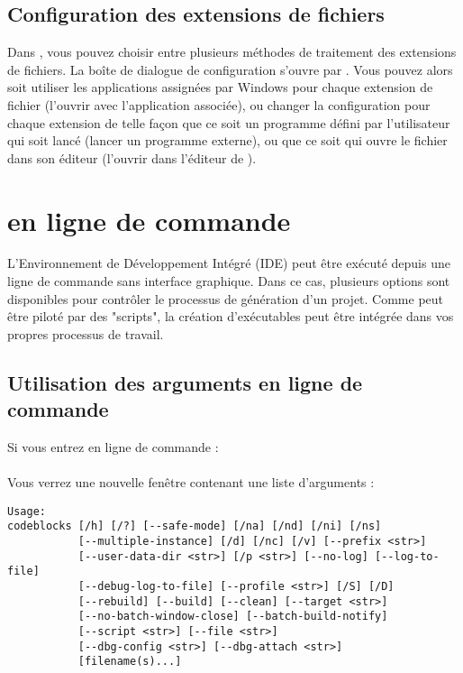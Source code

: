 \subsection{Configuration des extensions de fichiers}\label{sec:file_extension}

Dans \codeblocks, vous pouvez choisir entre plusieurs méthodes de traitement des extensions de fichiers. La boîte de dialogue de configuration s'ouvre par .
Vous pouvez alors soit utiliser les applications assignées par Windows pour chaque extension de fichier (l'ouvrir avec l'application associée), ou changer la configuration pour chaque extension de telle façon que ce soit un programme défini par l'utilisateur qui soit lancé (lancer un programme externe), ou que ce soit \codeblocks qui ouvre le fichier dans son éditeur (l'ouvrir dans l'éditeur de \codeblocks).


\section{\codeblocks en ligne de commande}

L'Environnement de Développement Intégré (IDE) \codeblocks peut être exécuté depuis une ligne de commande sans interface graphique. Dans ce cas, plusieurs options sont disponibles pour contrôler le processus de génération d'un projet. Comme \codeblocks peut être piloté par des "scripts", la création d'exécutables peut être intégrée dans vos propres processus de travail.

\subsection{Utilisation des arguments en ligne de commande}

Si vous entrez en ligne de commande :\\
\\
Vous verrez une nouvelle fenêtre contenant une liste d'arguments :
\begin{lstlisting}
Usage:
codeblocks [/h] [/?] [--safe-mode] [/na] [/nd] [/ni] [/ns]
           [--multiple-instance] [/d] [/nc] [/v] [--prefix <str>]
           [--user-data-dir <str>] [/p <str>] [--no-log] [--log-to-file]
           [--debug-log-to-file] [--profile <str>] [/S] [/D]
           [--rebuild] [--build] [--clean] [--target <str>]
           [--no-batch-window-close] [--batch-build-notify]
           [--script <str>] [--file <str>]
           [--dbg-config <str>] [--dbg-attach <str>]
           [filename(s)...]
\end{lstlisting}

